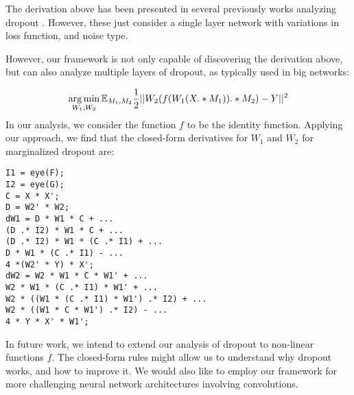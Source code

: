 
The derivation above has been presented in several previously works
analyzing dropout \cite{chen2013learning, chen2012marginalized, maaten2013learning}. 
However, these just consider a single layer network with variations in loss function, and noise type.

However, our framework is not only capable of discovering the derivation above,
but can also analyze multiple layers of dropout, as typically used in
big networks:



 


\begin{equation*}
  \operatorname*{arg\,min}_{W_1, W_2} \mathbb{E}_{M_1, M_2} \frac{1}{2}||W_2(f(W_1(X .* M_1)) .* M_2) - Y||^2
\end{equation*}
In our analysis, we consider the function $f$ to be the identity
function.  Applying our approach, we find that the closed-form derivatives for $W_1$ and $W_2$ for marginalized 
dropout are:
\begin{lstlisting}
I1 = eye(F);
I2 = eye(G);
C = X * X';
D = W2' * W2;
dW1 = D * W1 * C + ...
(D .* I2) * W1 * C + ...
(D .* I2) * W1 * (C .* I1) + ...
D * W1 * (C .* I1) - ...
4 *(W2' * Y) * X'; 
dW2 = W2 * W1 * C * W1' + ...
W2 * W1 * (C .* I1) * W1' + ...
W2 * ((W1 * (C .* I1) * W1') .* I2) + ...
W2 * ((W1 * C * W1') .* I2) - ...
4 * Y * X' * W1';
\end{lstlisting}

In future work, we intend to extend our analysis of dropout to
non-linear functions $f$. The closed-form rules might
allow us to understand why dropout works, and how to improve it. We
would also like to  employ our framework for more challenging neural network architectures involving
convolutions.
